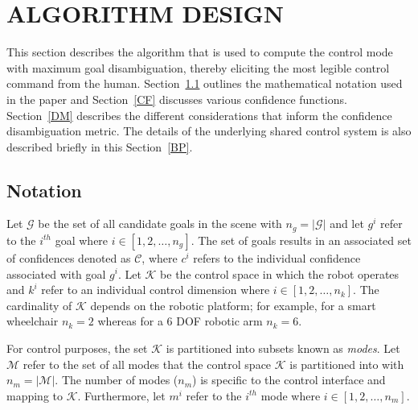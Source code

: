 \documentclass[conference]{IEEEtran}
\begin{document}
\section{ALGORITHM DESIGN} \label{ALGO}
This section describes the algorithm that is used to compute the control mode with maximum goal disambiguation, thereby eliciting the most legible control command from the human. Section~\ref{NOT} outlines the mathematical notation used in the paper and Section~\ref{CF} discusses various confidence functions. Section~\ref{DM} describes the different considerations that inform the confidence disambiguation metric. The details of the underlying shared control system is also described briefly in this Section~\ref{BP}.

\subsection{Notation}\label{NOT}


Let $\mathcal{G}$ be the set of all candidate goals in the scene with $n_g = \vert\mathcal{G}\vert$ and let $g^{i}$ refer to the $i^{th}$ goal where $i \in [1,2,\dots,n_g]$. The set of goals results in an associated set of confidences denoted as $\mathcal{C}$, where $c^{i}$ refers to the individual confidence associated with goal $g^{i}$. Let $\mathcal{K}$ be the control space in which the robot operates and $k^{i}$ refer to an individual control dimension where $i \in [1,2,\dots,n_k]$.  The cardinality of $\mathcal{K}$ depends on the robotic platform; for example, for a smart wheelchair $n_k = 2$ whereas for a 6 DOF robotic arm $n_k = 6$.

For control purposes, the set $\mathcal{K}$ is partitioned into subsets known as \textit{modes}. Let $\mathcal{M}$ refer to the set of all modes that the control space $\mathcal{K}$ is partitioned into with $n_{m} = \vert\mathcal{M}\vert$. The number of modes ($n_{m}$) is specific to the control interface and mapping to $\mathcal{K}$. Furthermore, let $m^{i}$ refer to the $i^{th}$ mode where $i \in [1,2,\dots,n_{m}]$.
\end{document}

